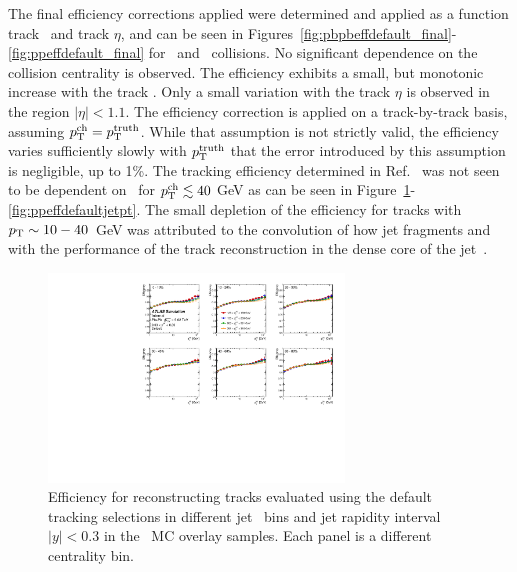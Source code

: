 The final efficiency corrections applied were determined and applied as a function track \pt\ and track $\eta$, and can be seen in Figures~\ref{fig:pbpbeffdefault_final}-\ref{fig:ppeffdefault_final} for \pp\ and \PbPb\ collisions.
No significant dependence on the collision centrality is observed.
The efficiency exhibits a small, but monotonic increase with the track \pt.
Only a small variation with the track $\eta$ is observed in the region $|\eta|<1.1$.
The efficiency correction is applied on a track-by-track basis, assuming $\mbox{$p_{\mathrm{T}}^{\mathrm{ch}}$} = \mbox{$p_{\mathrm{T}}^{\mathrm{truth}}$}$.
While that assumption is not strictly valid, the efficiency varies sufficiently slowly with $\mbox{$p_{\mathrm{T}}^{\mathrm{truth}}$}$ that the error introduced by this assumption is negligible, up to 1\%.
The tracking efficiency determined in Ref.~\cite{PhysRevC.98.024908} was not seen to be dependent on \ptjet\ for $\mbox{$p_{\mathrm{T}}^{\mathrm{ch}}$} \lesssim 40$ GeV as can be seen in Figure~\ref{fig:pbpbeffdefaultjetpt_y0}-\ref{fig:ppeffdefaultjetpt}.
The small depletion of the efficiency for tracks with $\mbox{$p_{\mathrm{T}}$} \sim 10-40$~GeV was attributed to the convolution of how jet fragments and with the performance of the track reconstruction in the dense core of the jet~\cite{PhysRevC.98.024908}.


\begin{figure}
\centering
\includegraphics[width=0.7\textwidth]{figures/main/corrections/eff_centrality_jetpt_jety0_ppTight.pdf}
\caption{Efficiency for reconstructing tracks evaluated using the default tracking selections in different jet \pT\ bins and jet rapidity interval $|y|<0.3$ in the \pbpb\ MC overlay samples.
Each panel is a different centrality bin.}
\label{fig:pbpbeffdefaultjetpt_y0}
\end{figure}

